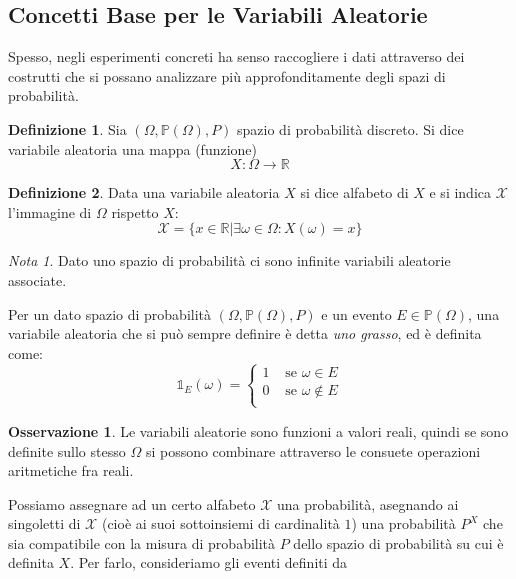 \documentclass{article}
\theoremstyle{plain}
\theoremstyle{definition}
\newtheorem{definizione}{Definizione}[section]
\newtheorem{osservazione}{Osservazione}[section]
\theoremstyle{remark}
\newtheorem*{nota}{Nota}
\begin{document}
\subsection{Concetti Base per le Variabili Aleatorie} %
\label{sub:concetti_base_per_le_variabili_aleatorie}
Spesso, negli esperimenti concreti ha senso raccogliere i dati attraverso dei costrutti che si possano analizzare più approfonditamente degli spazi di probabilità.
\begin{definizione}
	Sia $(\Omega, \mathds{P}(\Omega), P)$ spazio di probabilità discreto. Si dice variabile aleatoria una mappa (funzione)
	\begin{equation*}
		X\colon \Omega\to\mathds{R}
	\end{equation*}
\end{definizione}
\begin{definizione}
	Data una variabile aleatoria $X$ si dice alfabeto di $X$ e si indica $\mathcal{X}$ l'immagine di $\Omega$ rispetto $X$:
	\begin{equation*}
		\mathcal{X}=\{x\in\mathds{R}\vert \exists \omega\in\Omega\colon X(\omega)=x\}
	\end{equation*}
\end{definizione}
\begin{nota}
	Dato uno spazio di probabilità ci sono infinite variabili aleatorie associate.
\end{nota}
Per un dato spazio di probabilità $(\Omega, \mathds{P}(\Omega), P)$ e un evento $E\in\mathds{P}(\Omega)$, una variabile aleatoria che si può sempre definire è detta \textit{uno grasso}, ed è definita come:
\begin{equation*}
	\mathds{1}_E(\omega)=
	\begin{cases}
		1&\text{ se }\omega\in E\\
		0&\text{ se }\omega\notin E\\
	\end{cases}
\end{equation*}
\begin{osservazione}
	Le variabili aleatorie sono funzioni a valori reali, quindi se sono definite sullo stesso $\Omega$ si possono combinare attraverso le consuete operazioni aritmetiche fra reali.
\end{osservazione}
Possiamo assegnare ad un certo alfabeto $\mathcal{X}$ una probabilità, asegnando ai singoletti di $\mathcal{X}$ (cioè ai suoi sottoinsiemi di cardinalità $1$) una probabilità $P^X$ che sia compatibile con la misura di probabilità $P$ dello spazio di probabilità su cui è definita $X$. Per farlo, consideriamo gli eventi definiti da
\end{document}
